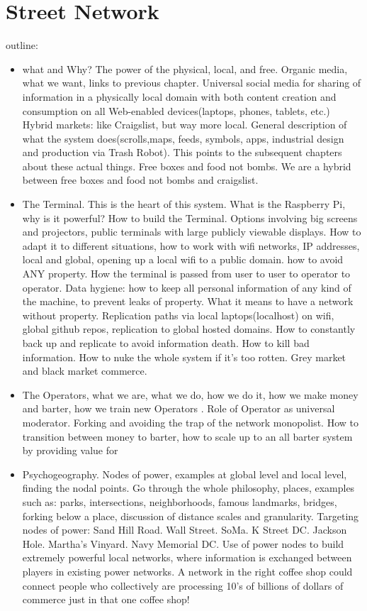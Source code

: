 
\section{Street Network}



outline:
\begin{itemize}
  \item
  what and Why?  The power of the physical, local, and free.  Organic media, what we want, links to previous chapter.  Universal social media for sharing of information in a physically local domain with both content creation and consumption on all Web-enabled devices(laptops, phones, tablets, etc.)  Hybrid markets: like Craigslist, but way more local.  General description of what the system does(scrolls,maps, feeds, symbols, apps, industrial design and production via Trash Robot). This points to the subsequent chapters about these actual things.  Free boxes and food not bombs.  We are a hybrid between free boxes and food not bombs and craigslist.
  \item
  The Terminal.  This is the heart of this system. What is the Raspberry Pi, why is it powerful?  How to build the Terminal. Options involving big screens and projectors, public terminals with large publicly viewable displays.  How to adapt it to different situations, how to work with wifi networks, IP addresses, local and global, opening up a local wifi to a public domain.  how to avoid ANY property.  How the terminal is passed from user to user to operator to operator.  Data hygiene: how to keep all personal information of any kind of the machine, to prevent leaks of property.  What it means to have a network without property.  Replication paths via local laptops(localhost) on wifi, global github repos, replication to global hosted domains. How to constantly back up and replicate to avoid information death.  How to kill bad information.  How to nuke the whole system if it's too rotten.  Grey market and black market commerce.
  \item
  The Operators, what we are, what we do, how we do it, how we make money and barter, how we train new Operators .  Role of Operator as universal moderator.  Forking and avoiding the trap of the network monopolist.  How to transition between money to barter, how to scale up to an all barter system by providing value for 
  \item
  Psychogeography.  Nodes of power, examples at global level and local level, finding the nodal points.  Go through the whole philosophy, places, examples such as: parks, intersections, neighborhoods, famous landmarks, bridges, forking below a place, discussion of distance scales and granularity.  Targeting nodes of power: Sand Hill Road. Wall Street. SoMa.  K Street DC. Jackson Hole. Martha's Vinyard.  Navy Memorial DC. Use of power nodes to build extremely powerful local networks, where information is exchanged between players in existing power networks.  A network in the right coffee shop could connect people who collectively are processing 10's of billions of dollars of commerce just in that one coffee shop!

\end{itemize}
